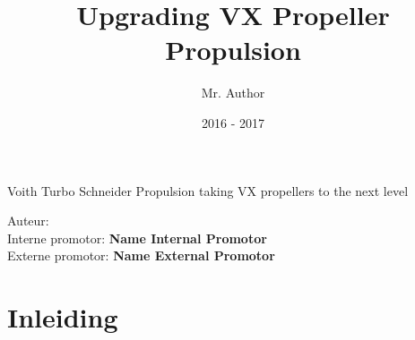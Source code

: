 \documentclass[11pt, a4paper, oneside]{article}
\title{Upgrading VX Propeller Propulsion}
\author{Mr. Author}
\date{2016 - 2017}
\newcommand{\internePromotor}{Name Internal Promotor}
\newcommand{\externePromotor}{Name External Promotor}
\begin{document}

	\begin{titlepage}
\newcommand{\subtitle}{Voith Turbo Schneider Propulsion taking VX propellers to the next level}

\newcommand{\subsubtitle}{Auteur: \textbf{\theauthor} \\
	Interne promotor: \textbf{\internePromotor} \\ 
	Externe promotor: \textbf{\externePromotor} \\
	}

				\vspace*{130mm}

				\begin{flushright}
				\bf
				\color{oranjerood}
				{
					\scshape	
					\huge
					\selectfont
					\thetitle
				}

				\vspace{0mm}
				\LARGE
				\subtitle
				\end{flushright}
				\vspace{\fill}
				{\color{blauwgroen} \subsubtitle}

				\newpage

	\end{titlepage}


\tableofcontents

\newpage



\chapter{Inleiding}
\end{document}
